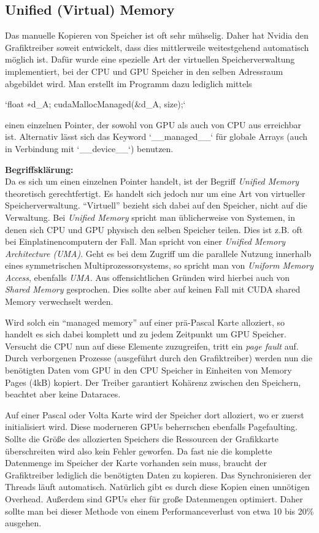 		\subsection*{Unified (Virtual) Memory}
		Das manuelle Kopieren von Speicher ist oft sehr mühselig. Daher hat Nvidia den Grafiktreiber soweit entwickelt, dass dies mittlerweile weitestgehend automatisch möglich ist. Dafür wurde eine spezielle Art der virtuellen Speicherverwaltung implementiert, bei der CPU und GPU Speicher in den selben Adressraum abgebildet wird. 
		Man erstellt im Programm dazu lediglich mittels 
		
		\li`float ∗d_A; cudaMallocManaged(&d_A, size);` 
		
		einen einzelnen Pointer, der sowohl von GPU als auch von CPU aus erreichbar ist. Alternativ lässt sich das Keyword \li`__managed__` für globale Arrays (auch in Verbindung mit \li`__device__`) benutzen.
		
		\newpage
		
		\textbf{Begriffsklärung:}\\
		Da es sich um einen einzelnen Pointer handelt, ist der Begriff \textit{Unified Memory} theoretisch gerechtfertigt. Es handelt sich jedoch nur um eine Art von virtueller Speicherverwaltung. \enquote{Virtuell} bezieht sich dabei auf den Speicher, nicht auf die Verwaltung. Bei \textit{Unified Memory} spricht man üblicherweise von Systemen, in denen sich CPU und GPU physisch den selben Speicher teilen. Dies ist z.B. oft bei Einplatinencomputern der Fall. Man spricht von einer \textit{Unified Memory Architecture (UMA)}. Geht es bei dem Zugriff um die parallele Nutzung innerhalb eines symmetrischen Multiprozessorsystems, so spricht man von \textit{Uniform Memory Access}, ebenfalls \textit{UMA}. Aus offensichtlichen Gründen wird hierbei auch von \textit{Shared Memory} gesprochen. Dies sollte aber auf keinen Fall mit CUDA \Gls{shared Memory} verwechselt werden.
		
		\bigskip
		
		Wird solch ein \enquote{managed memory} auf einer prä-Pascal Karte alloziert, so handelt es sich dabei komplett und zu jedem Zeitpunkt um GPU Speicher. Versucht die CPU nun auf diese Elemente zuzugreifen, tritt ein \textit{page fault} auf. Durch verborgenen Prozesse (ausgeführt durch den Grafiktreiber) werden nun die benötigten Daten vom GPU in den CPU Speicher in Einheiten von Memory Pages (4kB) kopiert. Der Treiber garantiert Kohärenz zwischen den Speichern, beachtet aber keine Dataraces.
		
		Auf einer Pascal oder Volta Karte wird der Speicher dort alloziert, wo er zuerst initialisiert wird. Diese moderneren GPUs beherrschen ebenfalls Pagefaulting. Sollte die Größe des allozierten Speichers die Ressourcen der Grafikkarte überschreiten wird also kein Fehler geworfen. Da fast nie die komplette Datenmenge im Speicher der Karte vorhanden sein muss, braucht der Grafiktreiber lediglich die benötigten Daten zu kopieren. Das Synchronisieren der \Glspl{Thread} läuft automatisch. Natürlich gibt es durch diese Kopien einen unnötigen Overhead. Außerdem sind GPUs eher für große Datenmengen optimiert. Daher sollte man bei dieser Methode von einem Performanceverlust von etwa 10 bis 20\% ausgehen. 
		
